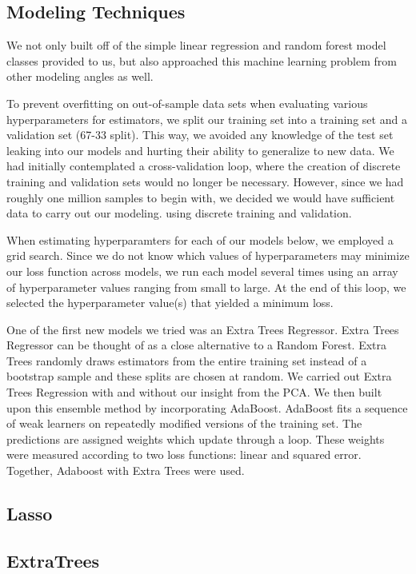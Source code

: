 \documentclass[11pt, oneside]{article}   	%
\begin{document}
\subsection{Modeling Techniques} 

We not only built off of the simple linear regression and random forest model classes provided to us, but also approached this machine learning problem from other modeling angles as well. 

To prevent overfitting on out-of-sample data sets when evaluating various hyperparameters for estimators, we split our training set into a training set and a validation set (67-33 split). This way, we avoided any knowledge of the test set leaking into our models and hurting their ability to generalize to new data. We had initially contemplated a cross-validation loop, where the creation of discrete training and validation sets would no longer be necessary. However, since we had roughly one million samples to begin with, we decided we would have sufficient data to carry out our modeling. using discrete training and validation.

When estimating hyperparamters for each of our models below, we employed a grid search. Since we do not know which values of hyperparameters may minimize our loss function across models, we run each model several times using an array of hyperparameter values ranging from small to large. At the end of this loop, we selected the hyperparameter value(s) that yielded a minimum loss. 

One of the first new models we tried was an Extra Trees Regressor. Extra Trees Regressor can be thought of as a close alternative to a Random Forest. Extra Trees randomly draws estimators from the entire training set instead of a bootstrap sample and these splits are chosen at random. We carried out Extra Trees Regression with and without our insight from the PCA. We then built upon this ensemble method by incorporating AdaBoost. AdaBoost fits a sequence of weak learners on repeatedly modified versions of the training set. The predictions are assigned weights which update through a loop. These weights were measured according to two loss functions: linear and squared error. Together, Adaboost with Extra Trees were used.


\subsection{Lasso} 

\subsection{ExtraTrees} 
\end{document}
